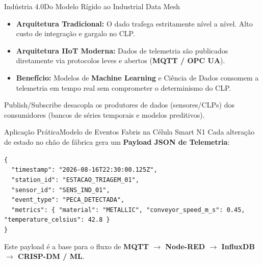 \begin{senaiframe}{Indústria 4.0}{Do Modelo Rígido ao Industrial Data Mesh}
  \begin{itemize}
    \item \textbf{Arquitetura Tradicional:} O dado trafega estritamente nível a nível. Alto custo de integração e gargalo no CLP.
    \item \textbf{Arquitetura IIoT Moderna:} Dados de telemetria são publicados diretamente via protocolos leves e abertos (\textbf{MQTT / OPC UA}).
    \item \textbf{Benefício:} Modelos de \textbf{Machine Learning} e Ciência de Dados consomem a telemetria em tempo real sem comprometer o determinismo do CLP.
  \end{itemize}

  \vspace{6pt}
  \begin{tcolorbox}[senaigreencard, title={Paradigma IIoT}]
    Publish/Subscribe desacopla os produtores de dados (sensores/CLPs) dos consumidores (bancos de séries temporais e modelos preditivos).
  \end{tcolorbox}
\end{senaiframe}

\begin{senaiframe}{Aplicação Prática}{Modelo de Eventos Fabris na Célula Smart N1}
  Cada alteração de estado no chão de fábrica gera um \textbf{Payload JSON de Telemetria}:

  \vspace{4pt}
  \begin{tcolorbox}[senaicard, title={Payload JSON de Exemplo}]
    \tiny
    \texttt{\{\\
    ~~"timestamp": "2026-08-16T22:30:00.125Z",\\
    ~~"station_id": "ESTACAO_TRIAGEM_01",\\
    ~~"sensor_id": "SENS_IND_01",\\
    ~~"event_type": "PECA_DETECTADA",\\
    ~~"metrics": \{ "material": "METALLIC", "conveyor_speed_m_s": 0.45, "temperature_celsius": 42.8 \}\\
    \}}
  \end{tcolorbox}

  \vspace{2pt}
  \small
  Este payload é a base para o fluxo de \textbf{MQTT $\rightarrow$ Node-RED $\rightarrow$ InfluxDB $\rightarrow$ CRISP-DM / ML}.
\end{senaiframe}

